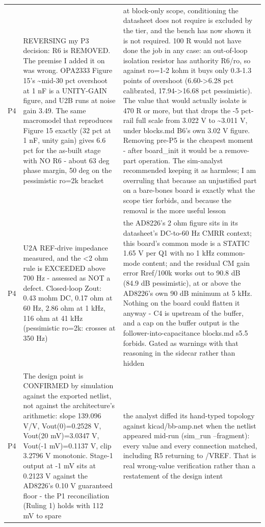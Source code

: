 \documentclass[11pt,a4paper]{article}
\begin{document}
{\begin{longtable}{lp{5.2cm}p{7.2cm}}
P4 & REVERSING my P3 decision: R6 is REMOVED. The premise I added it on was wrong. OPA2333 Figure 15's \textasciitilde{}mid-30 pct overshoot at 1 nF is a UNITY-GAIN figure, and U2B runs at noise gain 3.49. The same macromodel that reproduces Figure 15 exactly (32 pct at 1 nF, unity gain) gives 6.6 pct for the as-built stage with NO R6 - about 63 deg phase margin, 50 deg on the pessimistic ro=2k bracket & at block-only scope, conditioning the datasheet does not require is excluded by the tier, and the bench has now shown it is not required. 100 R would not have done the job in any case: an out-of-loop isolation resistor has authority R6/ro, so against ro=1-2 kohm it buys only 0.3-1.3 points of overshoot (6.60-\textgreater{}6.28 pct calibrated, 17.94-\textgreater{}16.68 pct pessimistic). The value that would actually isolate is 470 R or more, but that drops the -5 pct-rail full scale from 3.022 V to \textasciitilde{}3.011 V, under blocks.md B6's own 3.02 V figure. Removing pre-P5 is the cheapest moment - after board\_init it would be a remove-part operation. The sim-analyst recommended keeping it as harmless; I am overruling that because an unjustified part on a bare-bones board is exactly what the scope tier forbids, and because the removal is the more useful lesson \\
P4 & U2A REF-drive impedance measured, and the \textless{}2 ohm rule is EXCEEDED above 700 Hz - assessed as NOT a defect. Closed-loop Zout: 0.43 mohm DC, 0.17 ohm at 60 Hz, 2.86 ohm at 1 kHz, 116 ohm at 41 kHz (pessimistic ro=2k: crosses at 350 Hz) & the AD8226's 2 ohm figure sits in its datasheet's DC-to-60 Hz CMRR context; this board's common mode is a STATIC 1.65 V per Q1 with no 1 kHz common-mode content; and the residual CM gain error Rref/100k works out to 90.8 dB (84.9 dB pessimistic), at or above the AD8226's own 90 dB minimum at 5 kHz. Nothing on the board could flatten it anyway - C4 is upstream of the buffer, and a cap on the buffer output is the follower-into-capacitance blocks.md s5.5 forbids. Gated as warnings with that reasoning in the sidecar rather than hidden \\
P4 & The design point is CONFIRMED by simulation against the exported netlist, not against the architecture's arithmetic: slope 139.096 V/V, Vout(0)=0.2528 V, Vout(20 mV)=3.0347 V, Vout(-1 mV)=0.1137 V, clip 3.2796 V monotonic. Stage-1 output at -1 mV sits at 0.2123 V against the AD8226's 0.10 V guaranteed floor - the P1 reconciliation (Ruling 1) holds with 112 mV to spare & the analyst diffed its hand-typed topology against kicad/bb-amp.net when the netlist appeared mid-run (sim\_run --fragment): every value and every connection matched, including R5 returning to /VREF. That is real wrong-value verification rather than a restatement of the design intent \\

\end{longtable}}
\end{document}
